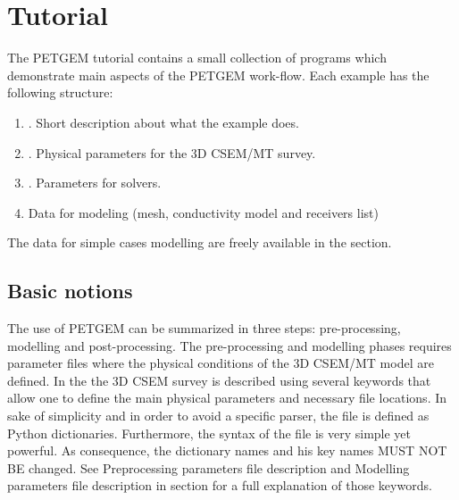 \documentclass[letterpaper,10pt,english]{sphinxmanual}
\begin{document}
\chapter{Tutorial}
\label{\detokenize{Tutorial:tutorial}}\label{\detokenize{Tutorial:id1}}\label{\detokenize{Tutorial::doc}}
The PETGEM tutorial contains a small collection of programs which demonstrate
main aspects of the PETGEM work-flow. Each example has the
following structure:
\begin{enumerate}
%
\item {} 
. Short description about what the example does.

\item {} 
. Physical parameters for the 3D CSEM/MT survey.

\item {} 
. Parameters for  solvers.

\item {} 
Data for modeling (mesh, conductivity model and receivers list)

\end{enumerate}

The data for simple cases modelling are freely available in the
{\hyperref[\detokenize{Download:download}]{}} section.


\section{Basic notions}
\label{\detokenize{Tutorial:basic-notions}}\label{\detokenize{Tutorial:id2}}
The use of PETGEM can be summarized in three steps: pre-processing, modelling and
post-processing. The pre-processing and modelling phases requires parameter files
where the physical conditions of the 3D CSEM/MT model are defined. In the
 the 3D CSEM survey is described using several keywords
that allow one to define the main physical parameters and necessary file
locations. In sake of simplicity and in order to avoid a specific parser, the
 file is defined as Python
dictionaries. Furthermore, the syntax of the  file is very simple yet powerful. As consequence, the
dictionary names and his key names MUST NOT BE changed. See Preprocessing
parameters file description and Modelling parameters file description
in {\hyperref[\detokenize{Manual:manual}]{}} section for a full explanation of those keywords.
\end{document}

